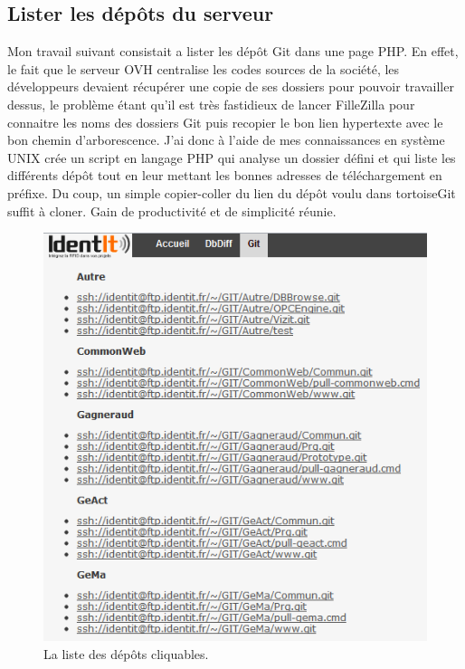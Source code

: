 
\subsection{Lister les dépôts du serveur}

Mon travail suivant consistait a lister les dépôt Git dans une page PHP. En
effet, le fait que le serveur OVH centralise les codes sources de la société,
les développeurs devaient récupérer une copie de ses dossiers pour pouvoir
travailler dessus, le problème étant qu'il est très fastidieux de lancer
FilleZilla pour connaitre les noms des dossiers Git puis recopier le bon lien
hypertexte avec le bon chemin d'arborescence. J'ai donc à l'aide de mes
connaissances en système UNIX crée un script en langage PHP qui analyse un
dossier défini et qui liste les différents dépôt tout en leur mettant les
bonnes adresses de téléchargement en préfixe. Du coup, un simple copier-coller
du lien du dépôt voulu dans tortoiseGit suffit à cloner. Gain de productivité
et de simplicité réunie.

\begin{figure}
\begin{center}
\includegraphics[scale=0.5]{images/repo.png}
\caption{La liste des dépôts cliquables.}
\end{center}
\end{figure}

